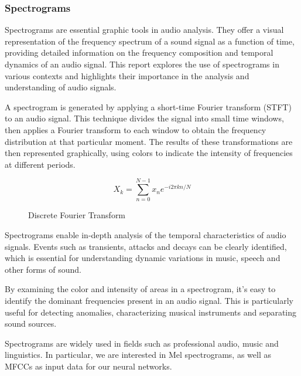 \documentclass[11pt]{article}
\begin{document}
\subsubsection{Spectrograms}

Spectrograms are essential graphic tools in audio analysis. They offer a visual representation of the frequency spectrum of a sound signal as a function of time, providing detailed information on the frequency composition and temporal dynamics of an audio signal. This report explores the use of spectrograms in various contexts and highlights their importance in the analysis and understanding of audio signals.

A spectrogram is generated by applying a short-time Fourier transform (STFT) to an audio signal. This technique divides the signal into small time windows, then applies a Fourier transform to each window to obtain the frequency distribution at that particular moment. The results of these transformations are then represented graphically, using colors to indicate the intensity of frequencies at different periods.



\begin{figure}[h]
  \begin{equation}
    X_k = \sum_{n=0}^{N-1} x_n e^{-i 2 \pi k n / N}
    \label{eq:fourier_transform}
  \end{equation}
  \caption{Discrete Fourier Transform}
\end{figure}

Spectrograms enable in-depth analysis of the temporal characteristics of audio signals. Events such as transients, attacks and decays can be clearly identified, which is essential for understanding dynamic variations in music, speech and other forms of sound.

By examining the color and intensity of areas in a spectrogram, it's easy to identify the dominant frequencies present in an audio signal. This is particularly useful for detecting anomalies, characterizing musical instruments and separating sound sources.

Spectrograms are widely used in fields such as professional audio, music and linguistics. In particular, we are interested in Mel spectrograms, as well as MFCCs as input data for our neural networks.
\end{document}
